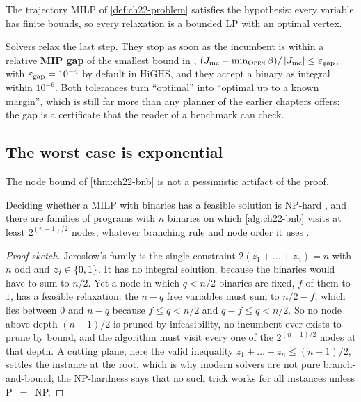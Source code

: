 The trajectory MILP of \cref{def:ch22-problem} satisfies the hypothesis:
every variable has finite bounds, so every relaxation is a bounded LP with
an optimal vertex.

Solvers relax the last step. They stop as soon as the incumbent is within a
relative \textbf{MIP gap} of the smallest bound in \Open,
$(J_{\mathrm{inc}} - \min_{\textsc{Open}} \beta)/\left\lvert J_{\mathrm{inc}} \right\rvert \le
\varepsilon_{\mathrm{gap}}$, with $\varepsilon_{\mathrm{gap}} = 10^{-4}$ by default in
HiGHS, and they accept a binary as integral within $10^{-6}$. Both
tolerances turn ``optimal'' into ``optimal up to a known margin'', which
is still far more than any planner of the earlier chapters offers: the gap
is a certificate that the reader of a benchmark can check.

\subsection{The worst case is exponential}

The node bound of \cref{thm:ch22-bnb} is not a pessimistic artifact of the
proof.

\begin{proposition}
\label{prop:ch22-complexity}
Deciding whether a MILP with binaries has a feasible solution is
NP-hard \cite{karp1972reducibility}, and there are families of programs
with $n$ binaries on which \cref{alg:ch22-bnb} visits at least
$2^{(n-1)/2}$ nodes, whatever branching rule and node order it uses
\cite{jeroslow1974trivial}.
\end{proposition}
\begin{proof}[Proof sketch]
Jeroslow's family is the single constraint
$2(z_1 + \dots + z_n) = n$ with $n$ odd and $z_j \in \left\{ 0,1 \right\}$. It has no
integral solution, because the binaries would have to sum to $n/2$. Yet a
node in which $q < n/2$ binaries are fixed, $f$ of them to $1$, has a
feasible relaxation: the $n - q$ free variables must sum to $n/2 - f$,
which lies between $0$ and $n - q$ because $f \le q < n/2$ and $q - f \le q
< n/2$. So no node above depth $(n-1)/2$ is pruned by infeasibility, no
incumbent ever exists to prune by bound, and the algorithm must visit
every one of the $2^{(n-1)/2}$ nodes at that depth. A cutting plane, here
the valid inequality $z_1 + \dots + z_n \le (n-1)/2$, settles the instance
at the root, which is why modern solvers are not pure branch-and-bound; the
NP-hardness says that no such trick works for all instances unless
P~$=$~NP.
\end{proof}

